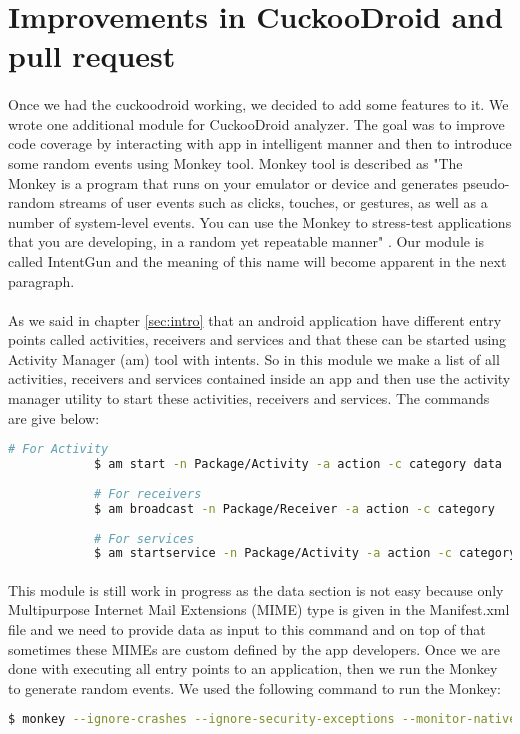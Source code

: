 \documentclass[../main.tex]{subfile}
\begin{document}
		\section{Improvements in CuckooDroid and pull request} \label{sec:improvements_cuckoodroid}
		\paragraph{} Once we had the cuckoodroid working, we decided to add some features to it. We wrote one additional module for CuckooDroid analyzer. The goal was to improve code coverage by interacting with app in intelligent manner and then to introduce some random events using Monkey \cite{monkey_tool} tool. Monkey tool is described as "The Monkey is a program that runs on your emulator or device and generates pseudo-random streams of user events such as clicks, touches, or gestures, as well as a number of system-level events. You can use the Monkey to stress-test applications that you are developing, in a random yet repeatable manner" \cite{monkey_tool}. Our module is called IntentGun and the meaning of this name will become apparent in the next paragraph.
		\paragraph{} As we said in chapter \ref{sec:intro} that an android application have different entry points called activities, receivers and services and that these can be started using Activity Manager (am) tool with intents. So in this module we make a list of all activities, receivers and services contained inside an app and then use the activity manager utility \cite{am} to start these activities, receivers and services. The commands are give below:
		
		\begin{lstlisting}[language=bash, numbers=none]
			# For Activity
			$ am start -n Package/Activity -a action -c category data
			
			# For receivers
			$ am broadcast -n Package/Receiver -a action -c category
			
			# For services
			$ am startservice -n Package/Activity -a action -c category data
		\end{lstlisting}
		\paragraph{} This module is still work in progress as the data section is not easy because only Multipurpose Internet Mail Extensions (MIME) type is given in the Manifest.xml file and we need to provide data as input to this command and on top of that sometimes these MIMEs are custom defined by the app developers. Once we are done with executing all entry points to an application, then we run the Monkey to generate random events. We used the following command to run the Monkey:
		\begin{lstlisting}[language=bash, numbers=none]
			$ monkey --ignore-crashes --ignore-security-exceptions --monitor-native-crashes -p package --throttle 500 500
		\end{lstlisting}
		
\end{document}

